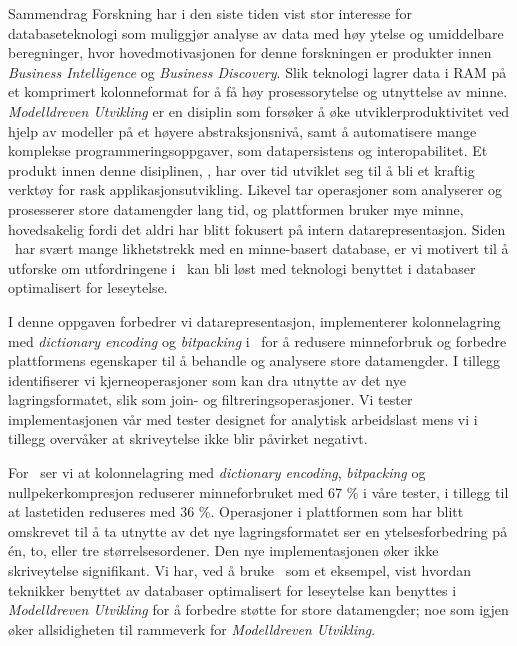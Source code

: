 {\Huge Sammendrag}
\vspace{1cm}
Forskning har i den siste tiden vist stor interesse for databaseteknologi som muliggjør analyse av data med høy ytelse og umiddelbare beregninger, hvor hovedmotivasjonen for denne forskningen er produkter innen \textit{Business Intelligence} og \textit{Business Discovery}. Slik teknologi lagrer data i RAM på et komprimert kolonneformat for å få høy prosessorytelse og utnyttelse av minne. \textit{Modelldreven Utvikling} er en disiplin som forsøker å øke utviklerproduktivitet ved hjelp av modeller på et høyere abstraksjonsnivå, samt å automatisere mange komplekse programmeringsoppgaver, som datapersistens og interopabilitet. Et produkt innen denne disiplinen, \gap, har over tid utviklet seg til å bli et kraftig verktøy for rask applikasjonsutvikling. Likevel tar operasjoner som analyserer og prosesserer store datamengder lang tid, og plattformen bruker mye minne, hovedsakelig fordi det aldri har blitt fokusert på intern datarepresentasjon. Siden \gap~har svært mange likhetstrekk med en minne-basert database, er vi motivert til å utforske om utfordringene i \gap~kan bli løst med teknologi benyttet i databaser optimalisert for leseytelse.

I denne oppgaven forbedrer vi datarepresentasjon, implementerer kolonnelagring med \textit{dictionary encoding} og \textit{bitpacking} i \gap~for å redusere minneforbruk og forbedre plattformens egenskaper til å behandle og analysere store datamengder. I tillegg identifiserer vi kjerneoperasjoner som kan dra utnytte av det nye lagringsformatet, slik som join- og filtreringsoperasjoner. Vi tester implementasjonen vår med tester designet for analytisk arbeidslast mens vi i tillegg overvåker at skriveytelse ikke blir påvirket negativt.

For \gap~ser vi at kolonnelagring med \textit{dictionary encoding}, \textit{bitpacking} og nullpekerkompresjon reduserer minneforbruket med 67 \% i våre tester, i tillegg til at lastetiden reduseres med 36 \%. Operasjoner i plattformen som har blitt omskrevet til å ta utnytte av det nye lagringsformatet ser en ytelsesforbedring på én, to, eller tre størrelsesordener. Den nye implementasjonen øker ikke skriveytelse signifikant. Vi har, ved å bruke \gap~som et eksempel, vist hvordan teknikker benyttet av databaser optimalisert for leseytelse kan benyttes i \textit{Modelldreven Utvikling} for å forbedre støtte for store datamengder; noe som igjen øker allsidigheten til rammeverk for \textit{Modelldreven Utvikling}.

